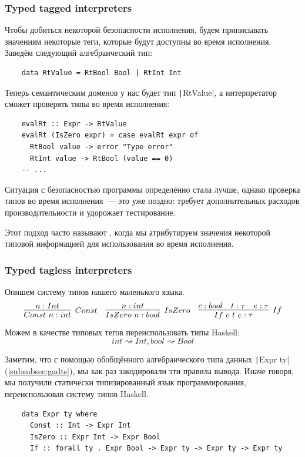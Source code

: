 \subsubsection{Typed tagged interpreters}

Чтобы добиться некоторой безопасности исполнения, будем приписывать значениям некоторые теги, которые будут доступны во время исполнения.
Заведём следующий алгебраический тип:
\begin{verbatim}
    data RtValue = RtBool Bool | RtInt Int
\end{verbatim}

Теперь семантическим доменов у нас будет тип \texttt|RtValue|, а интерпретатор сможет проверять типы во время исполнения:
\begin{verbatim}
    evalRt :: Expr -> RtValue
    evalRt (IsZero expr) = case evalRt expr of
      RtBool value -> error "Type error"
      RtInt value -> RtBool (value == 0)
    -- ...
\end{verbatim}

Ситуация с безопасностью программы определённо стала лучше, однако проверка типов во время исполнения~--- это уже поздно: требует дополнительных расходов производительности и удорожает тестирование.

Этот подход часто называют , когда мы атрибутируем значения некоторой типовой информацией для использования во время исполнения.

\subsubsection{Typed tagless interpreters} \label{subsubsec:typed-tagless-initial}

Опишем систему типов нашего маленького языка.
\begin{equation*}{}
    \infer[Const]{Const~n : int}{n : Int}
    \quad
    \infer[IsZero]{IsZero~n : bool}{n : int}
    \quad
    \infer[If]{If~c~t~e : \tau}{c : bool & t : \tau & e : \tau}
\end{equation*}
Можем в качестве типовых тегов переиспользовать типы Haskell: \[int \rightsquigarrow Int, bool \rightsquigarrow Bool\]

Заметим, что с помощью обобщённого алгебраического типа данных \texttt|Expr ty| (\ref{subsubsec:gadts}), мы как раз закодировали эти правила вывода.
Иначе говоря, мы получили статически типизированный язык программирования, переиспользовав систему типов Haskell.
\begin{verbatim}
    data Expr ty where
      Const :: Int -> Expr Int
      IsZero :: Expr Int -> Expr Bool
      If :: forall ty . Expr Bool -> Expr ty -> Expr ty -> Expr ty
\end{verbatim}

